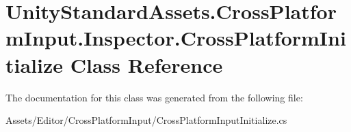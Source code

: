 \hypertarget{class_unity_standard_assets_1_1_cross_platform_input_1_1_inspector_1_1_cross_platform_initialize}{}\section{Unity\+Standard\+Assets.\+Cross\+Platform\+Input.\+Inspector.\+Cross\+Platform\+Initialize Class Reference}
\label{class_unity_standard_assets_1_1_cross_platform_input_1_1_inspector_1_1_cross_platform_initialize}


The documentation for this class was generated from the following file\+:\begin{DoxyCompactItemize}
\item 
Assets/\+Editor/\+Cross\+Platform\+Input/Cross\+Platform\+Input\+Initialize.\+cs\end{DoxyCompactItemize}
